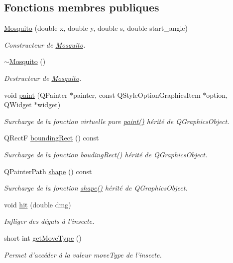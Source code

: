 \subsection*{Fonctions membres publiques}
\begin{DoxyCompactItemize}
\item 
\hyperlink{classMosquito_ad7755ed5b7cd5ed184c5cfb2d4f0785d}{Mosquito} (double x, double y, double s, double start\_\-angle)
\begin{DoxyCompactList}\small\item\em Constructeur de \hyperlink{classMosquito}{Mosquito}. \end{DoxyCompactList}\item 
\hyperlink{classMosquito_aec4169f2175c544c8d6e119164b469cd}{$\sim$Mosquito} ()
\begin{DoxyCompactList}\small\item\em Destructeur de \hyperlink{classMosquito}{Mosquito}. \end{DoxyCompactList}\item 
void \hyperlink{classMosquito_a306ab9aefce1f42ae5d46746a018c845}{paint} (QPainter $\ast$painter, const QStyleOptionGraphicsItem $\ast$option, QWidget $\ast$widget)
\begin{DoxyCompactList}\small\item\em Surcharge de la fonction virtuelle pure \hyperlink{classMosquito_a306ab9aefce1f42ae5d46746a018c845}{paint()} hérité de QGraphicsObject. \end{DoxyCompactList}\item 
QRectF \hyperlink{classBug_a9b39c25361faad07b1bf2dd927d09dab}{boundingRect} () const 
\begin{DoxyCompactList}\small\item\em Surcharge de la fonction boudingRect() hérité de QGraphicsObject. \end{DoxyCompactList}\item 
QPainterPath \hyperlink{classBug_a587a36d3145c2b4dba6c689af22c65ac}{shape} () const 
\begin{DoxyCompactList}\small\item\em Surcharge de la fonction \hyperlink{classBug_a587a36d3145c2b4dba6c689af22c65ac}{shape()} hérité de QGraphicsObject. \end{DoxyCompactList}\item 
void \hyperlink{classBug_a63402c05b5ba3fb034e41f1ced0e4b9f}{hit} (double dmg)
\begin{DoxyCompactList}\small\item\em Infliger des dégats à l'insecte. \end{DoxyCompactList}\item 
short int \hyperlink{classBug_aced471cedcfa855baddf4c827003e755}{getMoveType} ()
\begin{DoxyCompactList}\small\item\em Permet d'accéder à la valeur moveType de l'insecte. \end{DoxyCompactList}\end{DoxyCompactItemize}
